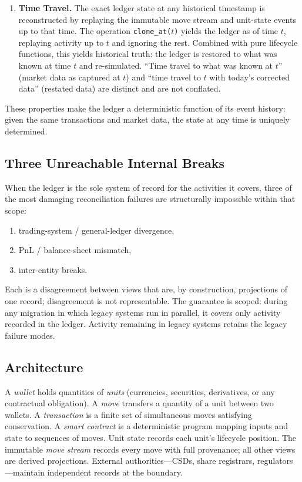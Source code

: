 \begin{enumerate}
\item \textbf{Time Travel.} The exact ledger state at any historical timestamp is reconstructed by replaying the immutable move stream and unit-state events up to that time. The operation \texttt{clone\_at($t$)} yields the ledger as of time $t$, replaying activity up to $t$ and ignoring the rest. Combined with pure lifecycle functions, this yields historical truth: the ledger is restored to what was known at time $t$ and re-simulated. ``Time travel to what was known at $t$'' (market data as captured at $t$) and ``time travel to $t$ with today's corrected data'' (restated data) are distinct and are not conflated.
\end{enumerate}

These properties make the ledger a deterministic function of its event history: given the same transactions and market data, the state at any time is uniquely determined.

\subsection{Three Unreachable Internal Breaks}

When the ledger is the sole system of record for the activities it covers, three of the most damaging reconciliation failures are structurally impossible within that scope:

\begin{enumerate}[nosep]
\item trading-system / general-ledger divergence,
\item PnL / balance-sheet mismatch,
\item inter-entity breaks.
\end{enumerate}

\noindent Each is a disagreement between views that are, by construction, projections of one record; disagreement is not representable. The guarantee is scoped: during any migration in which legacy systems run in parallel, it covers only activity recorded in the ledger. Activity remaining in legacy systems retains the legacy failure modes.

\subsection{Architecture}

A \textit{wallet} holds quantities of \textit{units} (currencies, securities, derivatives, or any contractual obligation). A \textit{move} transfers a quantity of a unit between two wallets. A \textit{transaction} is a finite set of simultaneous moves satisfying conservation. A \textit{smart contract} is a deterministic program mapping inputs and state to sequences of moves. Unit state records each unit's lifecycle position. The immutable \textit{move stream} records every move with full provenance; all other views are derived projections. External authorities---CSDs, share registrars, regulators---maintain independent records at the boundary.

